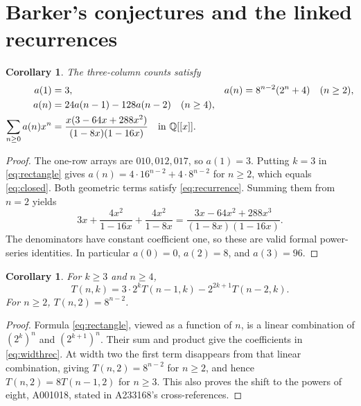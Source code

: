 \documentclass[11pt]{article}
\newtheorem{corollary}[theorem]{Corollary}
\begin{document}
\section{Barker's conjectures and the linked recurrences}

\begin{corollary}\label{cor:barker}
The three-column counts satisfy
\begin{align}
 a(1)&=3, & a(n)&=8^{n-2}(2^n+4)\quad(n\geq2),\label{eq:closed}\\
 a(n)&=24a(n-1)-128a(n-2)\quad(n\geq4),\label{eq:recurrence}\\
 \sum_{n\geq0}a(n)x^n
 &=\frac{x(3-64x+288x^2)}{(1-8x)(1-16x)}
 \quad\hbox{in }\mathbb{Q}[[x]].\label{eq:gf}
\end{align}
\end{corollary}
\begin{proof}
The one-row arrays are $010,012,017$, so $a(1)=3$.
Putting $k=3$ in \eqref{eq:rectangle} gives
$a(n)=4\cdot16^{n-2}+4\cdot8^{n-2}$ for $n\geq2$,
which equals \eqref{eq:closed}. Both geometric terms satisfy
\eqref{eq:recurrence}. Summing them from $n=2$ yields
\[
 3x+\frac{4x^2}{1-16x}+\frac{4x^2}{1-8x}
 =\frac{3x-64x^2+288x^3}{(1-8x)(1-16x)}.
\]
The denominators have constant coefficient one, so these are valid formal
power-series identities. In particular $a(0)=0$, $a(2)=8$, and $a(3)=96$.
\end{proof}

\begin{corollary}\label{cor:recurrences}
For $k\geq3$ and $n\geq4$,
\begin{equation}\label{eq:widthrec}
 T(n,k)=3\cdot2^kT(n-1,k)-2^{2k+1}T(n-2,k).
\end{equation}
For $n\geq2$, $T(n,2)=8^{n-2}$.
\end{corollary}
\begin{proof}
Formula \eqref{eq:rectangle}, viewed as a function of $n$,
is a linear combination of $(2^k)^n$ and $(2^{k+1})^n$.
Their sum and product give the coefficients in \eqref{eq:widthrec}.
At width two the first term disappears from that linear combination,
giving $T(n,2)=8^{n-2}$ for $n\geq2$, and hence
$T(n,2)=8T(n-1,2)$ for $n\geq3$.
This also proves the shift to the powers of eight, A001018, stated in
A233168's cross-references.
\end{proof}
\end{document}
